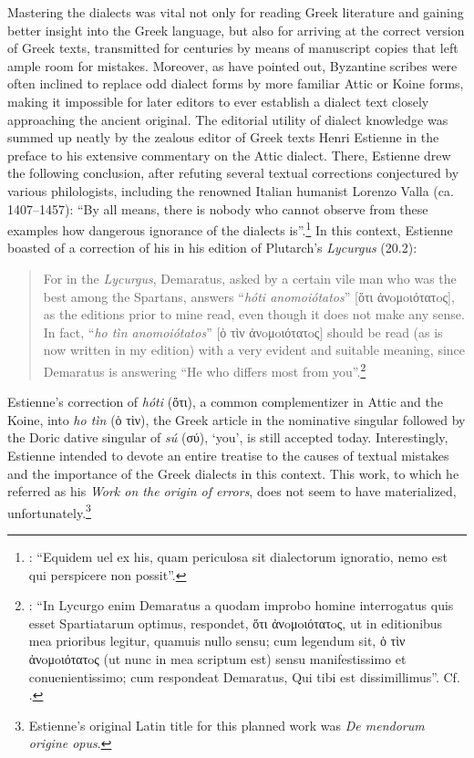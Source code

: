 Mastering the dialects was vital not only for reading Greek literature and gaining better insight into the Greek language, but also for arriving at the correct version of Greek texts, transmitted for centuries by means of manuscript copies that left ample room for mistakes. Moreover, as \citet[47--48]{Reynolds1991} have pointed out, Byzantine scribes were often inclined to replace odd dialect forms by more familiar Attic or Koine forms, making it impossible for later editors to ever establish a dialect text closely approaching the ancient original. The editorial utility of dialect knowledge was summed up neatly by the zealous editor of Greek texts Henri Estienne in the preface to his extensive commentary on the Attic dialect. There, Estienne drew the following conclusion, after refuting several textual corrections conjectured by various philologists, including the renowned Italian humanist Lorenzo Valla (ca. 1407–1457): “By all means, there is nobody who cannot observe from these examples how dangerous ignorance of the dialects is”.\footnote{\citet[¶.iii\textsc{\textsuperscript{v}}]{Estienne1573}: “Equidem uel ex his, quam periculosa sit dialectorum ignoratio, nemo est qui perspicere non possit”.} In this context, Estienne boasted of a correction of his in his edition of Plutarch’s \textit{Lycurgus} (20.2):

\begin{quote}
For in the \textit{Lycurgus}, Demaratus, asked by a certain vile man who was the best among the Spartans, answers “\textit{hóti anomoiótatos}” [ὅτι ἀνoμoιότατoς], as the editions prior to mine read, even though it does not make any sense. In fact, “\textit{ho tìn anomoiótatos}” [ὁ τὶν ἀνoμoιότατoς] should be read (as is now written in my edition) with a very evident and suitable meaning, since Demaratus is answering “He who differs most from you”.\footnote{\citet[¶.iii\textsc{\textsuperscript{v}}]{Estienne1573}: “In Lycurgo enim Demaratus a quodam improbo homine interrogatus quis esset Spartiatarum optimus, respondet, ὅτι ἀνoμoιότατoς, ut in editionibus mea prioribus legitur, quamuis nullo sensu; cum legendum sit, ὁ τὶν ἀνoμoιότατoς (ut nunc in mea scriptum est) sensu manifestissimo et conuenientissimo; cum respondeat Demaratus, Qui tibi est dissimillimus”. Cf. \citet[36, 43–44]{Estienne1581}.}
\end{quote}

Estienne’s correction of \textit{hóti} (ὅτι), a common complementizer in Attic and the Koine, into \textit{ho tìn} (ὁ τὶν), the Greek article in the nominative singular followed by the Doric dative singular of \textit{sú} (σύ), ‘you’, is still accepted today. Interestingly, Estienne intended to devote an entire treatise to the causes of textual mistakes and the importance of the Greek dialects in this context. This work, to which he referred as his \textit{Work on the origin of errors}, does not seem to have materialized, unfortunately.\footnote{Estienne’s original Latin title for this planned work was \textit{De mendorum origine opus}.}

